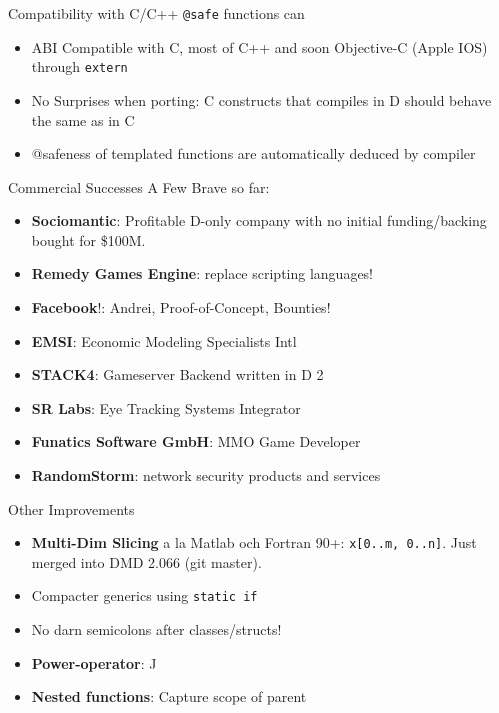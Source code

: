 \documentclass[xcolor=dvipsnames]{beamer}
\begin{document}
\begin{frame}[fragile]{Compatibility with C/C++}
  \texttt{@safe} functions can
  \begin{itemize}[<+->]
  \item ABI Compatible with C, most of C++ and soon Objective-C (Apple IOS) through \texttt{extern}
  \item No Surprises when porting: C constructs that compiles in D should
    behave the same as in C
  \item @safeness of templated functions are automatically deduced by compiler
  \end{itemize}
\end{frame}

\begin{frame}[fragile]{Commercial Successes}
  A Few Brave so far:
  \begin{itemize}[<+->]
  \item \textbf{Sociomantic}: Profitable D-only company with no initial
    funding/backing bought for \$100M.
  \item \textbf{Remedy Games Engine}: replace scripting languages!
  \item \textbf{Facebook}!: Andrei, Proof-of-Concept, Bounties!
  \item \textbf{EMSI}: Economic Modeling Specialists Intl
  \item \textbf{STACK4}: Gameserver Backend written in D 2
  \item \textbf{SR Labs}: Eye Tracking Systems Integrator
  \item \textbf{Funatics Software GmbH}: MMO Game Developer
  \item \textbf{RandomStorm}: network security products and services
  \end{itemize}
\end{frame}

\begin{frame}[fragile]{Other Improvements}
  \begin{itemize}[<+->]
  \item \textbf{Multi-Dim Slicing} a la Matlab och Fortran 90+:
    \texttt{x[0..m, 0..n]}. Just merged into DMD 2.066 (git master).
  \item Compacter generics using \texttt{static if}
  \item No darn semicolons after classes/structs!
  \item \textbf{Power-operator}: ^^
  \item \textbf{Nested functions}: Capture scope of parent
  \end{itemize}
\end{frame}
\end{document}
